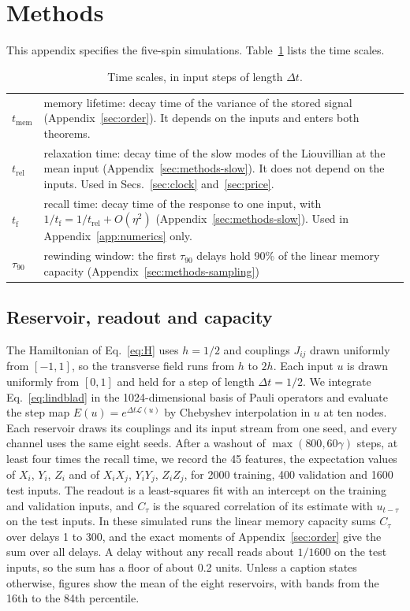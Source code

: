 \section{Methods}
\label{sec:methods}
This appendix specifies the five-spin simulations. Table~\ref{tab:times} lists the time scales.

\begin{table}[!t]
\caption{\label{tab:times}Time scales, in input steps of length $\Delta t$.}
\centering\footnotesize\setlength{\tabcolsep}{4pt}
\begin{tabular}{@{}lp{}@{}}
\toprule
$t_{\mathrm{mem}}$ & memory lifetime: decay time of the variance of the stored signal (Appendix~\ref{sec:order}). It
  depends on the inputs and enters both theorems.\\
$t_{\mathrm{rel}}$ & relaxation time: decay time of the slow modes of the Liouvillian at the mean input
  (Appendix~\ref{sec:methods-slow}). It does not depend on the inputs. Used in Secs.~\ref{sec:clock}
  and~\ref{sec:price}.\\
$t_{\mathrm f}$ & recall time: decay time of the response to one input, with
  $1/t_{\mathrm f}=1/t_{\mathrm{rel}}+O(\eta^2)$ (Appendix~\ref{sec:methods-slow}). Used in
  Appendix~\ref{app:numerics} only.\\
$\tau_{90}$ & rewinding window: the first $\tau_{90}$ delays hold 90\% of the linear memory capacity
  (Appendix~\ref{sec:methods-sampling})\\
\bottomrule
\end{tabular}
\end{table}

\subsection{Reservoir, readout and capacity}
\label{sec:methods-reservoir}
The Hamiltonian of Eq.~\eqref{eq:H} uses $h=1/2$ and couplings $J_{ij}$ drawn uniformly from $[-1,1]$, so the
transverse field runs from $h$ to $2h$. Each input $u$ is drawn uniformly from $[0,1]$ and held for a step of length
$\Delta t=1/2$. We integrate Eq.~\eqref{eq:lindblad} in the 1024-dimensional basis of Pauli operators and evaluate the
step map $E(u)=e^{\Delta t\mathcal L(u)}$ by Chebyshev interpolation in $u$ at ten nodes. Each reservoir draws its
couplings and its input stream from one seed, and every channel uses the same eight seeds. After a washout of $\max(800,60\gamma)$ steps, at least four times the recall
time, we record the 45 features, the expectation values of $X_i$, $Y_i$, $Z_i$ and of $X_iX_j$, $Y_iY_j$, $Z_iZ_j$, for
2000 training, 400 validation and 1600 test inputs. The readout is a least-squares fit with an intercept on the
training and validation inputs, and $C_\tau$ is the squared correlation of its estimate with $u_{t-\tau}$ on the test
inputs. In these simulated runs the linear memory capacity sums $C_\tau$ over delays 1 to 300, and the exact
moments of Appendix~\ref{sec:order} give the sum over all delays. A delay without any recall reads about $1/1600$
on the test inputs, so the sum has a floor of about 0.2 units. Unless a caption states otherwise, figures show
the mean of the eight reservoirs, with bands from the 16th to the 84th percentile.

